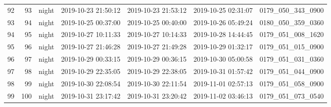 \begin{longtable}{lrlllll}
92 & 93 & night & 2019-10-23 21:50:12 & 2019-10-23 21:53:12 & 2019-10-25 02:31:07 & 0179_050_343_0900 \\
93 & 94 & night & 2019-10-25 00:37:00 & 2019-10-25 00:40:00 & 2019-10-26 05:49:24 & 0180_050_359_0360 \\
94 & 95 & night & 2019-10-27 10:11:33 & 2019-10-27 10:14:33 & 2019-10-28 14:44:45 & 0179_051_008_1620 \\
95 & 96 & night & 2019-10-27 21:46:28 & 2019-10-27 21:49:28 & 2019-10-29 01:32:17 & 0179_051_015_0900 \\
96 & 97 & night & 2019-10-29 00:33:15 & 2019-10-29 00:36:15 & 2019-10-30 05:00:58 & 0179_051_031_0360 \\
97 & 98 & night & 2019-10-29 22:35:05 & 2019-10-29 22:38:05 & 2019-10-31 01:57:42 & 0179_051_044_0900 \\
98 & 99 & night & 2019-10-30 22:08:54 & 2019-10-30 22:11:54 & 2019-11-01 02:57:13 & 0179_051_058_0900 \\
99 & 100 & night & 2019-10-31 23:17:42 & 2019-10-31 23:20:42 & 2019-11-02 03:46:13 & 0179_051_073_0540 \\
\end{longtable}
